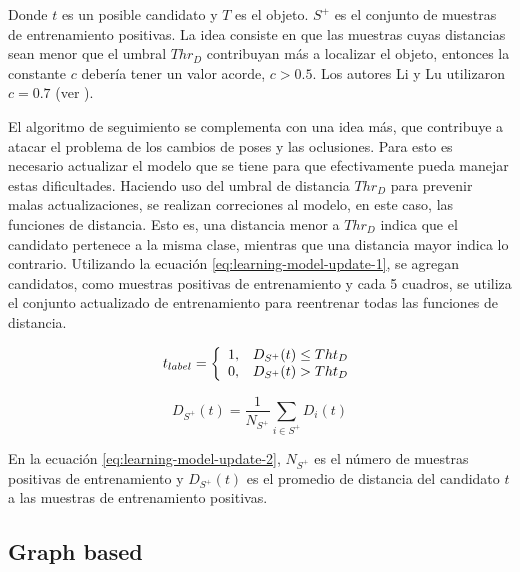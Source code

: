 \documentclass[a4paper,10pt]{article}
\begin{document}
Donde $t$ es un posible candidato y $T$ es el objeto. $S^{+}$ es el
conjunto de muestras de entrenamiento positivas. La idea consiste en
que las muestras cuyas distancias sean menor que el umbral $Thr_{D}$
contribuyan más a localizar el objeto, entonces la constante $c$ debería tener
un valor acorde, $c > 0.5$. Los autores Li y Lu utilizaron $c = 0.7$ (ver
\cite{local-learning}).

El algoritmo de seguimiento se complementa con una idea más, que
contribuye a atacar el problema de los cambios de poses y las oclusiones.
Para esto es necesario actualizar el modelo que se tiene para
que efectivamente pueda manejar estas dificultades.
Haciendo uso del umbral de distancia $Thr_{D}$ para prevenir
malas actualizaciones, se realizan correciones al modelo,
en este caso, las funciones de distancia. Esto es, una distancia
menor a $Thr_{D}$ indica que el candidato pertenece a la misma clase,
mientras que una distancia mayor indica lo contrario. Utilizando
la ecuación \ref{eq:learning-model-update-1}, se agregan candidatos,
como muestras positivas de entrenamiento y cada 5 cuadros,
se utiliza el conjunto actualizado de entrenamiento para
reentrenar todas las funciones de distancia.

\begin{equation}
    \label{eq:learning-model-update-1}
    t_{label} = \left\{
                \begin{array}{l l}
                    1, & D_{S^{+}}(t) \leq Tht_{D}\\
                    0, & D_{S^{+}}(t) >  Tht_{D}
                \end{array} \right.
\end{equation}

\begin{equation}
    \label{eq:learning-model-update-2}
    D_{S^{+}}(t) = \dfrac{1}{N_{S^{+}}} \sum_{i \in S^{+}} D_{i}(t)
\end{equation}

En la ecuación \ref{eq:learning-model-update-2}, $N_{S^{+}}$ es el
número de muestras positivas de entrenamiento y $D_{S^{+}}(t)$
es el promedio de distancia del candidato $t$ a las muestras
de entrenamiento positivas.

\subsection{Graph based}
\end{document}
